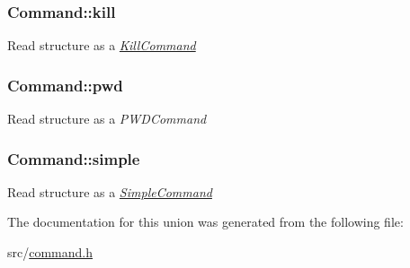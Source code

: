 \subsubsection[{\texorpdfstring{kill}{kill}}]{ Command\+::kill}\hypertarget{unionCommand_a19c5261961f2f9a7fcbf9f5379d3f98a}{}\label{unionCommand_a19c5261961f2f9a7fcbf9f5379d3f98a}
Read structure as a {\itshape \hyperlink{structKillCommand}{Kill\+Command}} 
\subsubsection[{\texorpdfstring{pwd}{pwd}}]{ Command\+::pwd}\hypertarget{unionCommand_a34fc21bb2a7fee2df4d3674b9d8166ff}{}\label{unionCommand_a34fc21bb2a7fee2df4d3674b9d8166ff}
Read structure as a {\itshape P\+W\+D\+Command} 
\subsubsection[{\texorpdfstring{simple}{simple}}]{ Command\+::simple}\hypertarget{unionCommand_a269da4d9b16689de14a0ec83636b59e8}{}\label{unionCommand_a269da4d9b16689de14a0ec83636b59e8}
Read structure as a {\itshape \hyperlink{structSimpleCommand}{Simple\+Command}} 

The documentation for this union was generated from the following file\+:\begin{DoxyCompactItemize}
\item 
src/\hyperlink{command_8h}{command.\+h}\end{DoxyCompactItemize}
